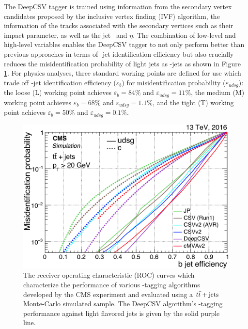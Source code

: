 The DeepCSV tagger is trained using information from the secondary vertex candidates proposed by the inclusive vertex finding (IVF) algorithm, the information of the tracks associated with the secondary vertices such as their impact parameter, as well as the jet \pT\ and $\eta$. The combination of low-level and high-level variables enables the DeepCSV tagger to not only perform better than previous approaches in terms of \qrkb-jet identification efficiency but also crucially reduces the misidentification probability of light jets as \qrkb-jets as shown in Figure \ref{fig:btagperf}. For physics analyses, three standard working points are defined for use which trade off \qrkb-jet identification efficiency ($\varepsilon_{b}$) for misidentification probability ($\varepsilon_{udsg}$): the loose (L) working point achieves $\varepsilon_{b} = 84\%$ and $\varepsilon_{udsg} = 11\%$, the medium (M) working point achieves $\varepsilon_{b} = 68\%$ and $\varepsilon_{udsg} = 1.1\%$, and the tight (T) working point achieves $\varepsilon_{b} = 50\%$ and $\varepsilon_{udsg} = 0.1\%$.

\begin{figure}[htbp]
  \centering
    \includegraphics[width=4.5in]{images/btagperf}
    \caption[CMS \qrkb-Tagging Performance]{The receiver operating characteristic (ROC) curves which characterize the performance of various \qrkb-tagging algorithms developed by the CMS experiment and evaluated using a $t\bar{t}+\mathrm{jets}$ Monte-Carlo simulated sample. The DeepCSV algorithm's \qrkb-tagging performance against light flavored jets is given by the solid purple line.\cite{CMSBTAG}}
    \label{fig:btagperf}
\end{figure}


